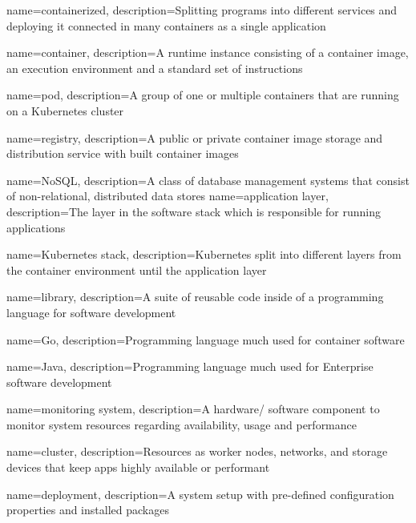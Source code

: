 {
    name={containerized},
    description={Splitting programs into different services and deploying it connected in many containers as a single application}
}

{
    name={container},
    description={A runtime instance consisting of a container image, an execution environment and a standard set of instructions}
}

{
    name={pod},
    description={A group of one or multiple containers that are running on a Kubernetes cluster}
}

{
    name={registry},
    description={A public or private container image storage and distribution service with built container images}
}

{
    name={NoSQL},
    description={A class of database management systems that consist of non-relational, distributed data stores}
}
{
    name={application layer},
    description={The layer in the software stack which is responsible for running applications}
}

{
    name={Kubernetes stack},
    description={Kubernetes split into different layers from the container environment until the application layer}
}

{
    name={library},
    description={A suite of reusable code inside of a programming language for software development}
}

{
    name={Go},
    description={Programming language much used for container software}
}

{
    name={Java},
    description={Programming language much used for Enterprise software development}
}

{
    name={monitoring system},
    description={A hardware/ software component to monitor system resources regarding availability, usage and performance}
}

{
    name={cluster},
    description={Resources as worker nodes, networks, and storage devices that keep apps highly available or performant}
}

{
    name={deployment},
    description={A system setup with pre-defined configuration properties and installed packages}
}

